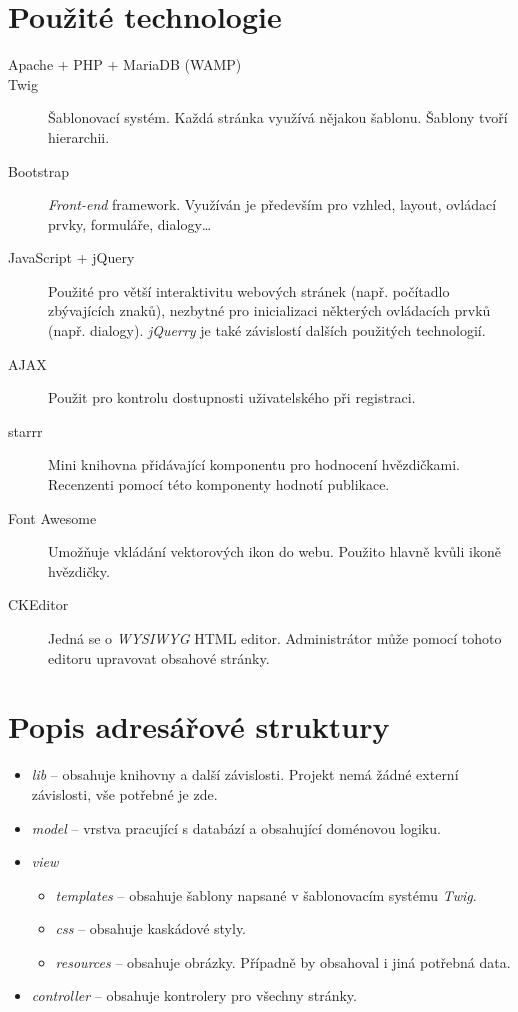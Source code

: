 \documentclass[12pt, a4paper]{article}
\begin{document}
\section{Použité technologie}
\begin{description}
	\item [Apache + PHP + MariaDB (WAMP)]
	\item [Twig] Šablonovací systém. Každá stránka využívá nějakou šablonu. Šablony tvoří hierarchii.
	\item [Bootstrap] \emph{Front-end} framework. Využíván je především pro vzhled, layout, ovládací prvky, formuláře, dialogy\dots
	\item [JavaScript + jQuery] Použité pro větší interaktivitu webových stránek (např. počítadlo zbývajících znaků), nezbytné pro inicializaci některých ovládacích prvků (např. dialogy). \emph{jQuerry} je také závislostí dalších použitých technologií.
	\item [AJAX] Použit pro kontrolu dostupnosti uživatelského při registraci.
	\item [starrr] Mini knihovna přidávající komponentu pro hodnocení hvězdičkami. Recenzenti pomocí této komponenty hodnotí publikace.
	\item [Font Awesome] Umožňuje vkládání vektorových ikon do webu. Použito hlavně kvůli ikoně hvězdičky.
	\item [CKEditor] Jedná se o \emph{WYSIWYG} HTML editor. Administrátor může pomocí tohoto editoru upravovat obsahové stránky.
\end{description}


\section{Popis adresářové struktury}
\begin{itemize}
	\item \emph{lib} -- obsahuje knihovny a další závislosti. Projekt nemá žádné externí závislosti, vše potřebné je zde.
	\item \emph{model} -- vrstva pracující s databází a obsahující doménovou logiku.
	\item \emph{view}
	\begin{itemize}[label=$\bullet$]
		\item \emph{templates} -- obsahuje šablony napsané v šablonovacím systému \emph{Twig}.
		\item \emph{css} -- obsahuje kaskádové styly.
		\item \emph{resources} -- obsahuje obrázky. Případně by obsahoval i jiná potřebná data.
	\end{itemize}
	\item \emph{controller} -- obsahuje kontrolery pro všechny stránky.
\end{itemize}
\end{document}
